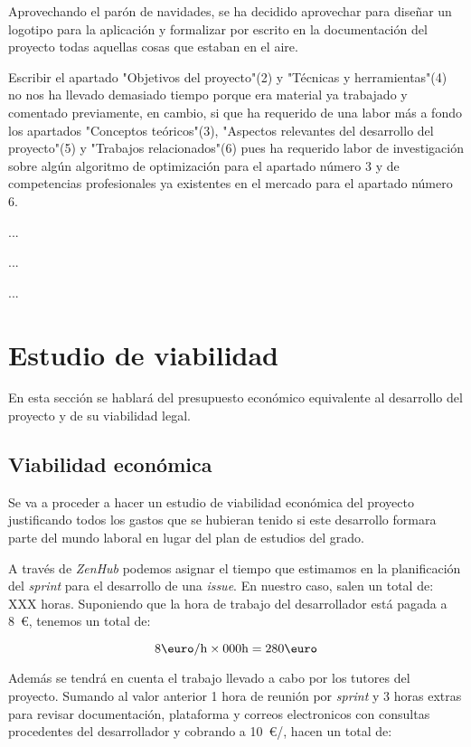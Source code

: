 Aprovechando el parón de navidades, se ha decidido aprovechar para diseñar un logotipo para la aplicación y formalizar por escrito en la documentación del proyecto todas aquellas cosas que estaban en el aire.

Escribir el apartado "Objetivos del proyecto"(2) y "Técnicas y herramientas"(4) no nos ha llevado demasiado tiempo porque era material ya trabajado y comentado previamente, en cambio, si que ha requerido de una labor más a fondo los apartados "Conceptos teóricos"(3), "Aspectos relevantes del desarrollo del proyecto"(5) y "Trabajos relacionados"(6) pues ha requerido labor de investigación sobre algún algoritmo de optimización para el apartado número 3 y de competencias profesionales ya existentes en el mercado para el apartado número 6. 


...

...

...

\section{Estudio de viabilidad}

En esta sección se hablará del presupuesto económico equivalente al desarrollo del proyecto y de su viabilidad legal.

\subsection{Viabilidad económica}

Se va a proceder a hacer un estudio de viabilidad económica del proyecto justificando todos los gastos que se hubieran tenido si este desarrollo formara parte del mundo laboral en lugar del plan de estudios del grado.

A través de \textit{ZenHub} podemos asignar el tiempo que estimamos en la planificación del \textit{sprint} para el desarrollo de una \textit{issue}. En nuestro caso, salen un total de: XXX horas. Suponiendo que la hora de trabajo del desarrollador está pagada a 8~\euro, tenemos un total de:

\[8\text{\euro}/\text{h}\times 000\text{h}=280\text{\euro} \]

Además se tendrá en cuenta el trabajo llevado a cabo por los tutores del proyecto. Sumando al valor anterior 1 hora de reunión por \textit{sprint} y 3 horas extras para revisar documentación, plataforma y correos electronicos con consultas procedentes del desarrollador y cobrando a 10~\euro/, hacen un total de:

